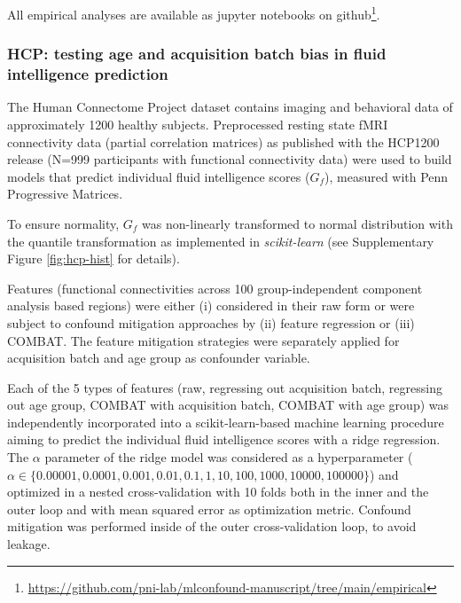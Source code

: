 \documentclass{article}
\begin{document}
All empirical analyses are available as jupyter notebooks on github\footnote{\href{https://github.com/pni-lab/mlconfound-manuscript/tree/main/empirical}{https://github.com/pni-lab/mlconfound-manuscript/tree/main/empirical}}.

\subsubsection*{HCP: testing age and acquisition batch bias in fluid intelligence prediction}

The Human Connectome Project dataset contains imaging and behavioral data of approximately 1200 healthy subjects\citep{van2013wu}. Preprocessed resting state fMRI connectivity data (partial correlation matrices)\citep{glasser2013minimal} as published with the HCP1200 release (N=999 participants with functional connectivity data) were used to build models that predict individual fluid intelligence scores ($G_f$), measured with Penn Progressive Matrices\citep{duncan2000neural}.

To ensure normality, $G_f$ was non-linearly transformed to normal distribution with the quantile transformation\citep{beasley2009rank} as implemented in \emph{scikit-learn}\citep{pedregosa2011scikit} (see Supplementary Figure \ref{fig:hcp-hist} for details).

Features (functional connectivities across 100 group-independent component analysis based regions) were either (i) considered in their raw form or were subject to confound mitigation approaches by (ii) feature regression\citep{rao2017predictive} or (iii) COMBAT\citep{johnson2007adjusting, fortin2018harmonization}.
The feature mitigation strategies were separately applied for acquisition batch and age group as confounder variable.

Each of the 5 types of features (raw, regressing out acquisition batch, regressing out age group, COMBAT with acquisition batch, COMBAT with age group) was independently incorporated into a scikit-learn-based\citep{pedregosa2011scikit} machine learning procedure aiming to predict the individual fluid intelligence scores with a ridge regression\citep{hoerl1970ridge}. The $\alpha$ parameter of the ridge model was considered as a hyperparameter ($\alpha \in \{0.00001, 0.0001, 0.001, 0.01, 0.1, 1, 10, 100, 1000, 10000, 100000\}$) and optimized in a nested cross-validation with 10 folds both in the inner and the outer loop and with mean squared error as optimization metric. Confound mitigation was performed inside of the outer cross-validation loop, to avoid leakage.
\end{document}
